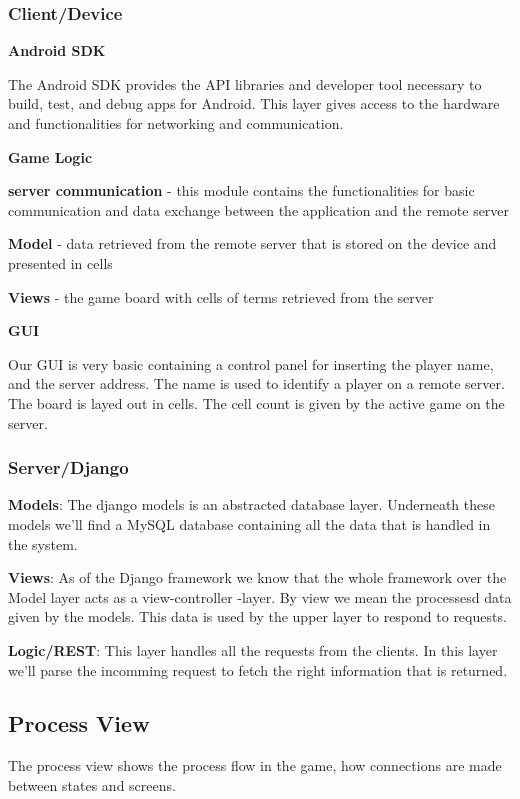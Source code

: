 \subsubsection{Client/Device}

{\bf Android SDK}

The Android SDK provides the API libraries and developer tool necessary to build, 
test, and debug apps for Android. This layer gives access to the hardware and 
functionalities for networking and communication.


{\bf Game Logic}

{\bf server communication} - this module contains the functionalities for 
basic communication and data exchange between the application and the
remote server

{\bf Model} - data retrieved from the remote server that is stored on the device
and presented in cells

{\bf Views} - the game board with cells of terms retrieved from the server


{\bf GUI}

Our GUI is very basic containing a control panel for inserting the player name, 
and the server address. The name is used to identify a player on a remote server.
The board is layed out in cells. The cell count is given by the active game on the server.

\subsubsection{Server/Django}

{\bf Models}: The django models is an abstracted database layer. Underneath these models we'll
find a MySQL database containing all the data that is handled in the system.

{\bf Views}: As of the Django framework we know that the whole framework over the Model layer acts
as a view-controller -layer. By view we mean the processesd data given by the models.
This data is used by the upper layer to respond to requests.

{\bf Logic/REST}: This layer handles all the requests from the clients. In this layer we'll parse the
incomming request to fetch the right information that is returned.


\subsection{Process View}
The process view shows the process flow in the game, how connections are made
between states and screens.

